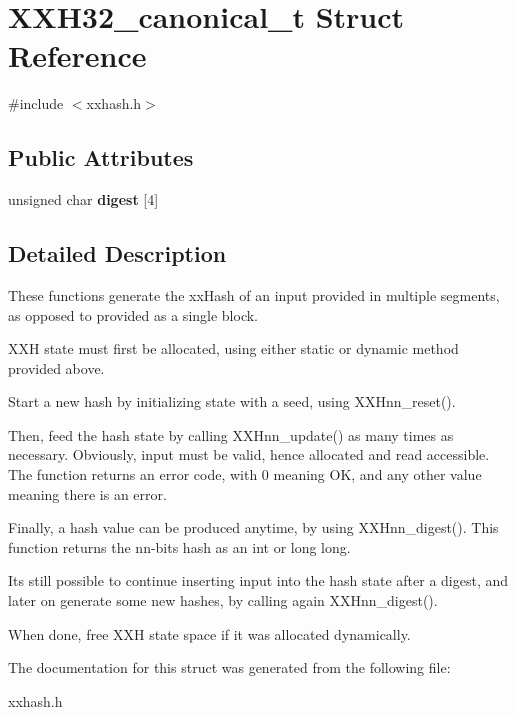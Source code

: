 \hypertarget{structXXH32__canonical__t}{}\section{X\+X\+H32\+\_\+canonical\+\_\+t Struct Reference}
\label{structXXH32__canonical__t}


{\ttfamily \#include $<$xxhash.\+h$>$}

\subsection*{Public Attributes}
\begin{DoxyCompactItemize}
\item 
\hypertarget{structXXH32__canonical__t_a85a83578344a5dd1c7a6cc0472230f30}{}unsigned char {\bfseries digest} \mbox{[}4\mbox{]}\label{structXXH32__canonical__t_a85a83578344a5dd1c7a6cc0472230f30}

\end{DoxyCompactItemize}


\subsection{Detailed Description}
These functions generate the xx\+Hash of an input provided in multiple segments, as opposed to provided as a single block.

X\+X\+H state must first be allocated, using either static or dynamic method provided above.

Start a new hash by initializing state with a seed, using X\+X\+Hnn\+\_\+reset().

Then, feed the hash state by calling X\+X\+Hnn\+\_\+update() as many times as necessary. Obviously, input must be valid, hence allocated and read accessible. The function returns an error code, with 0 meaning O\+K, and any other value meaning there is an error.

Finally, a hash value can be produced anytime, by using X\+X\+Hnn\+\_\+digest(). This function returns the nn-\/bits hash as an int or long long.

It\textquotesingle{}s still possible to continue inserting input into the hash state after a digest, and later on generate some new hashes, by calling again X\+X\+Hnn\+\_\+digest().

When done, free X\+X\+H state space if it was allocated dynamically. 

The documentation for this struct was generated from the following file\+:\begin{DoxyCompactItemize}
\item 
xxhash.\+h\end{DoxyCompactItemize}
